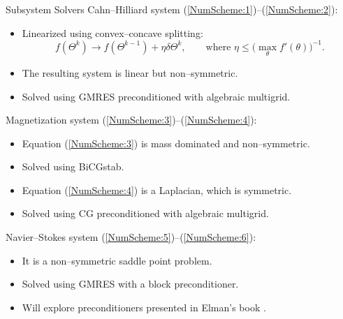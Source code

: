 \documentclass[9pt]{beamer}
\begin{document}
\begin{frame}{Subsystem Solvers}
	Cahn--Hilliard system (\ref{NumScheme:1})--(\ref{NumScheme:2}):
	\begin{itemize}
		\item Linearized using convex--concave splitting:
		$$
			f(\Theta^k)\to f(\Theta^{k-1}) + \eta \delta \Theta^k, \quad \quad \text{where } \eta\leq \big(\max_\theta f'(\theta)\big)^{-1}.
		$$
		\item The resulting system is linear but non--symmetric.
		\item Solved using GMRES preconditioned with algebraic multigrid.
	\end{itemize}
	Magnetization system (\ref{NumScheme:3})--(\ref{NumScheme:4}):
	\begin{itemize}
		\item Equation (\ref{NumScheme:3}) is mass dominated and non--symmetric.
		\item Solved using BiCGstab.
		\item Equation (\ref{NumScheme:4}) is a Laplacian, which is symmetric.
		\item Solved using CG preconditioned with algebraic multigrid.
	\end{itemize}

	Navier--Stokes system (\ref{NumScheme:5})--(\ref{NumScheme:6}):
	\begin{itemize}
		\item It is a non--symmetric saddle point problem.
		\item Solved using GMRES with a block preconditioner.
		\item Will explore preconditioners presented in Elman's book \cite{Precond}.
	\end{itemize}
\end{frame}
\end{document}
